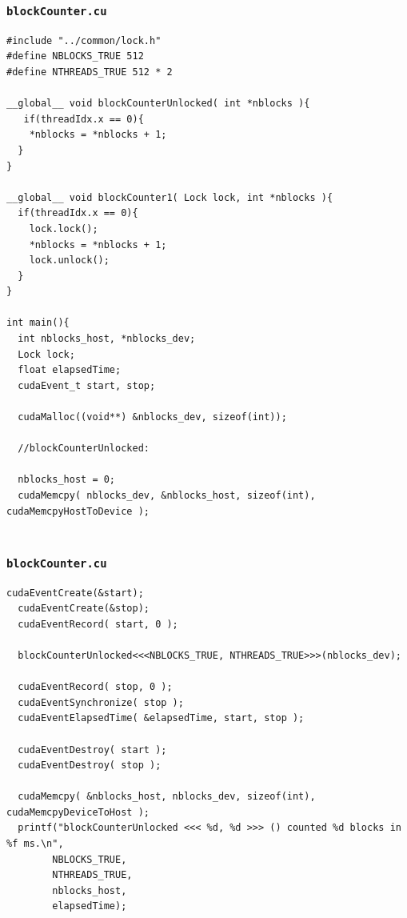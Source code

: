 \documentclass[handout]{beamer}
\numberwithin{equation}{section}
\begin{document}
\begin{frame}[fragile]
\frametitle{\tt blockCounter.cu} \lstset{basicstyle=\tiny}
\begin{lstlisting}[name=bc]
#include "../common/lock.h"
#define NBLOCKS_TRUE 512
#define NTHREADS_TRUE 512 * 2

__global__ void blockCounterUnlocked( int *nblocks ){
   if(threadIdx.x == 0){
    *nblocks = *nblocks + 1;
  }
}

__global__ void blockCounter1( Lock lock, int *nblocks ){
  if(threadIdx.x == 0){
    lock.lock();
    *nblocks = *nblocks + 1;
    lock.unlock();
  }
}

int main(){
  int nblocks_host, *nblocks_dev;
  Lock lock;
  float elapsedTime;
  cudaEvent_t start, stop;
 
  cudaMalloc((void**) &nblocks_dev, sizeof(int));
  
  //blockCounterUnlocked:

  nblocks_host = 0;
  cudaMemcpy( nblocks_dev, &nblocks_host, sizeof(int), cudaMemcpyHostToDevice );
  
\end{lstlisting}
\end{frame}

\begin{frame}[fragile]
\frametitle{\tt blockCounter.cu} \lstset{basicstyle=\tiny}
\begin{lstlisting}[name=bc]
  cudaEventCreate(&start);
  cudaEventCreate(&stop);
  cudaEventRecord( start, 0 );

  blockCounterUnlocked<<<NBLOCKS_TRUE, NTHREADS_TRUE>>>(nblocks_dev);

  cudaEventRecord( stop, 0 );
  cudaEventSynchronize( stop );
  cudaEventElapsedTime( &elapsedTime, start, stop );

  cudaEventDestroy( start );
  cudaEventDestroy( stop ); 

  cudaMemcpy( &nblocks_host, nblocks_dev, sizeof(int), cudaMemcpyDeviceToHost );
  printf("blockCounterUnlocked <<< %d, %d >>> () counted %d blocks in %f ms.\n", 
        NBLOCKS_TRUE,
        NTHREADS_TRUE,
        nblocks_host,
        elapsedTime);
\end{lstlisting}
\end{frame}
\end{document}
